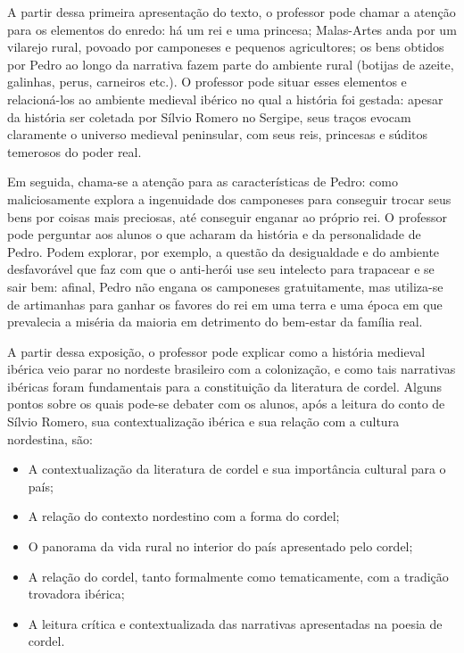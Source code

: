 \documentclass[11pt]{extarticle}
\begin{document}
A partir dessa primeira apresentação do texto, o professor pode chamar a atenção para os elementos do enredo: há um rei e uma princesa; Malas-Artes anda por um vilarejo rural, povoado por camponeses e pequenos agricultores; os bens obtidos por Pedro ao longo da narrativa fazem parte do ambiente rural (botijas de azeite, galinhas, perus, carneiros etc.).
O professor pode situar esses elementos e relacioná-los ao ambiente medieval ibérico no qual a história foi gestada: apesar da história ser coletada por Sílvio Romero no Sergipe, seus traços evocam claramente o universo medieval peninsular, com seus reis, princesas e súditos temerosos do poder real.

Em seguida, chama-se a atenção para as características de Pedro: como maliciosamente explora a ingenuidade dos camponeses para conseguir trocar seus bens por coisas mais preciosas, até conseguir enganar ao próprio rei.
O professor pode perguntar aos alunos o que acharam da história e da personalidade de Pedro.
Podem explorar, por exemplo, a questão da desigualdade e do ambiente desfavorável que faz com que o anti-herói use seu intelecto para trapacear e se sair bem: afinal, Pedro não engana os camponeses gratuitamente, mas utiliza-se de artimanhas para ganhar os favores do rei em uma terra e uma época em que prevalecia a miséria da maioria em detrimento do bem-estar da família real.

A partir dessa exposição, o professor pode explicar como a história medieval ibérica veio parar no nordeste brasileiro com a colonização, e como tais narrativas ibéricas foram fundamentais para a constituição da literatura de cordel.
Alguns pontos sobre os quais pode-se debater com os alunos, após a leitura do conto de Sílvio Romero, sua contextualização ibérica e sua relação com a cultura nordestina, são:

\begin{itemize}
\item A contextualização da literatura de cordel e sua importância cultural para o país;

\item A relação do contexto nordestino com a forma do cordel;

\item O panorama da vida rural no interior do país apresentado pelo cordel;

\item A relação do cordel, tanto formalmente como tematicamente, com a tradição trovadora ibérica;

\item A leitura crítica e contextualizada das narrativas apresentadas na poesia de cordel.
\end{itemize}
\end{document}
